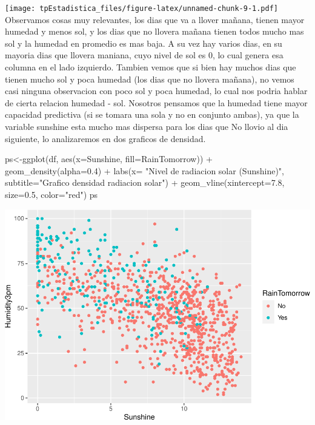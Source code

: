 \documentclass[
]{article}
\newenvironment{Shaded}{\begin{snugshade}}{\end{snugshade}}
\newcommand{\AttributeTok}[1]{\textcolor[rgb]{0.77,0.63,0.00}{#1}}
\newcommand{\FloatTok}[1]{\textcolor[rgb]{0.00,0.00,0.81}{#1}}
\newcommand{\FunctionTok}[1]{\textcolor[rgb]{0.00,0.00,0.00}{#1}}
\newcommand{\NormalTok}[1]{#1}
\newcommand{\OtherTok}[1]{\textcolor[rgb]{0.56,0.35,0.01}{#1}}
\newcommand{\SpecialCharTok}[1]{\textcolor[rgb]{0.00,0.00,0.00}{#1}}
\newcommand{\StringTok}[1]{\textcolor[rgb]{0.31,0.60,0.02}{#1}}
\begin{document}
\texttt{[image: tpEstadistica\_files/figure-latex/unnamed-chunk-9-1.pdf]}
Observamos cosas muy relevantes, los dias que va a llover mañana, tienen
mayor humedad y menos sol, y los dias que no llovera mañana tienen todos
mucho mas sol y la humedad en promedio es mas baja. A su vez hay varios
dias, en su mayoria dias que llovera maniana, cuyo nivel de sol es 0, lo
cual genera esa columna en el lado izquierdo. Tambien vemos que si bien
hay muchos dias que tienen mucho sol y poca humedad (los dias que no
llovera mañana), no vemos casi ninguna observacion con poco sol y poca
humedad, lo cual nos podria hablar de cierta relacion humedad - sol.
Nosotros pensamos que la humedad tiene mayor capacidad predictiva (si se
tomara una sola y no en conjunto ambas), ya que la variable sunshine
esta mucho mas dispersa para los dias que No llovio al dia siguiente, lo
analizaremos en dos graficos de densidad.

\begin{Shaded}
\begin{Highlighting}[]
\NormalTok{ps}\OtherTok{\textless{}{-}}\FunctionTok{ggplot}\NormalTok{(df, }\FunctionTok{aes}\NormalTok{(}\AttributeTok{x=}\NormalTok{Sunshine, }\AttributeTok{fill=}\NormalTok{RainTomorrow)) }\SpecialCharTok{+}
  \FunctionTok{geom\_density}\NormalTok{(}\AttributeTok{alpha=}\FloatTok{0.4}\NormalTok{) }\SpecialCharTok{+} \FunctionTok{labs}\NormalTok{(}\AttributeTok{x=} \StringTok{"Nivel de radiacion solar (Sunshine)"}\NormalTok{,}
       \AttributeTok{subtitle=}\StringTok{"Grafico densidad radiacion solar"}\NormalTok{) }\SpecialCharTok{+} \FunctionTok{geom\_vline}\NormalTok{(}\AttributeTok{xintercept=}\FloatTok{7.8}\NormalTok{, }\AttributeTok{size=}\FloatTok{0.5}\NormalTok{, }\AttributeTok{color=}\StringTok{"red"}\NormalTok{)}
\NormalTok{ps}
\end{Highlighting}
\end{Shaded}

\includegraphics{tpEstadistica_files/figure-latex/unnamed-chunk-10-1.pdf}
\end{document}
